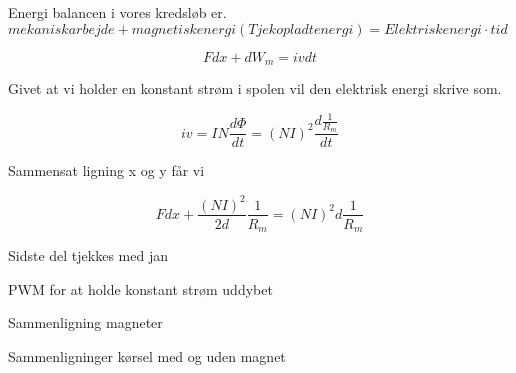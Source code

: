 Energi balancen i vores kredsløb er.
$mekanisk arbejde+ magnetisk energi(Tjek opladt energi)=Elektrisk energi \cdot tid$

\begin{equation}
F dx + dW_m = iv dt
\end{equation}


Givet at vi holder en konstant strøm i spolen vil den elektrisk energi skrive som.

\begin{equation}
iv=IN \frac{d\Phi}{dt} =(NI)^2  \frac{d\frac{1}{R_m}}{dt}
\end{equation}
  

Sammensat ligning x og y får vi

\begin{equation}
F dx+\frac{(NI)^2}{2d} \frac{1}{R_m} =(NI)^2  d \frac{1}{R_m}
\end{equation}

Sidste del tjekkes med jan

PWM for at holde konstant strøm uddybet 

Sammenligning magneter

Sammenligninger kørsel med og uden magnet